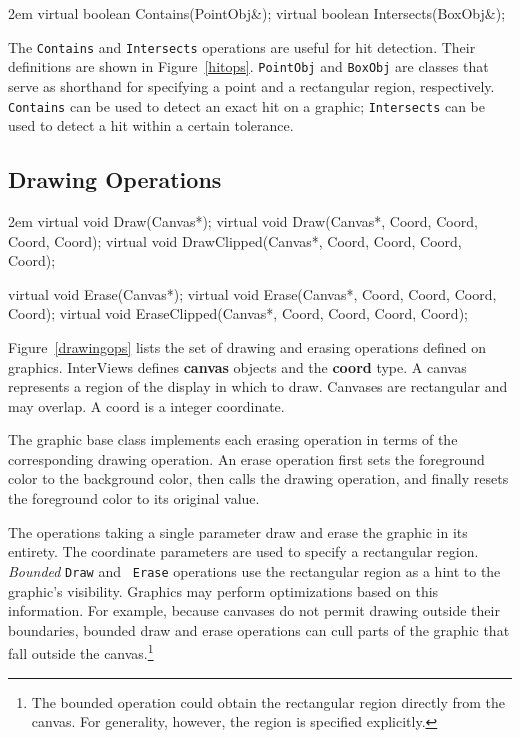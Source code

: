 \begin{figure*}
\begin{code}{2em}
virtual boolean Contains(PointObj&);
virtual boolean Intersects(BoxObj&);
\end{code}
\vspace{1ex}
\caption{Interface to operations supporting hit detection}
\label{hitops}
\end{figure*}

The {\tt Contains} and {\tt Intersects}
operations are useful for hit detection.  Their definitions are
shown in Figure~\ref{hitops}.
{\tt PointObj} and {\tt BoxObj} are classes that serve as
shorthand for specifying a point and a rectangular region, respectively.
{\tt Contains} can be used to detect an
exact hit on a graphic; {\tt Intersects} can be used to detect a hit
within a certain tolerance.

\subsection{Drawing Operations}

\begin{figure*}
\begin{code}{2em}
virtual void Draw(Canvas*);
virtual void Draw(Canvas*, Coord, Coord, Coord, Coord);
virtual void DrawClipped(Canvas*, Coord, Coord, Coord, Coord);

virtual void Erase(Canvas*);
virtual void Erase(Canvas*, Coord, Coord, Coord, Coord);
virtual void EraseClipped(Canvas*, Coord, Coord, Coord, Coord);
\end{code}
\vspace{1ex}
\caption{Interface to drawing operations}
\label{drawingops}
\end{figure*}

Figure~\ref{drawingops} lists the set of drawing and erasing operations
defined on graphics. 
InterViews defines {\bf canvas} objects and the {\bf coord} type.  A canvas
represents a region of the display in which to draw.  Canvases are
rectangular and may overlap. A coord is a integer coordinate.

The graphic base class implements each erasing operation in terms of
the corresponding drawing operation.  An erase operation first sets
the foreground color to the background
color, then calls the drawing operation, 
and finally resets the foreground color to its original value.

The operations taking a single parameter draw and erase the graphic
in its entirety.  The coordinate parameters are used to specify a
rectangular region.  {\em Bounded}\/ {\tt Draw} and {\tt
Erase} operations use the rectangular region as a hint to the graphic's
visibility.  Graphics may perform optimizations based on this information.
For example, because canvases do not permit drawing outside their boundaries,
bounded draw and erase operations can cull parts of the graphic that fall
outside the canvas.\footnote{The bounded operation could obtain the
rectangular region directly from the canvas.  For generality, however,
the region is specified explicitly.}

